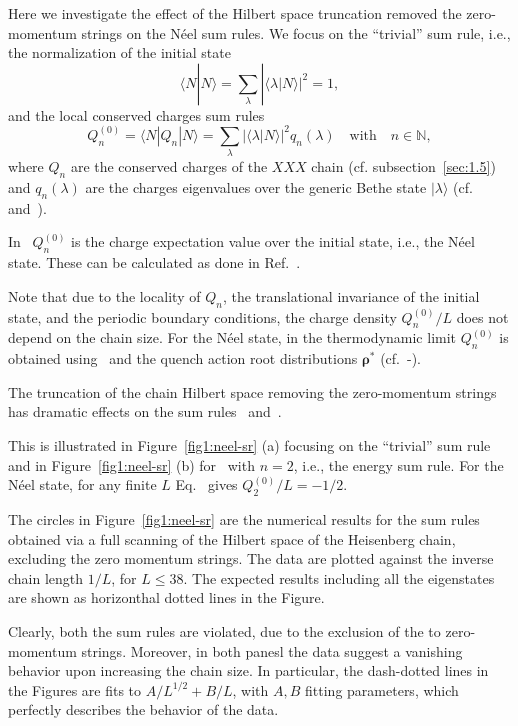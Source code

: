 \documentclass[11pt]{iopart}
\begin{document}
Here we investigate the effect of the Hilbert space truncation removed the 
zero-momentum strings on the N\'eel sum rules. 
We focus on the ``trivial'' sum rule, i.e., the normalization of the initial 
state 
%
\begin{equation}
\label{sr-trivial}
\langle N|N\rangle=\sum\limits_{\lambda}|\langle\lambda|N\rangle|^2=1, 
\end{equation}
%
and the local conserved charges sum rules 
%
\begin{equation}
\label{sr-charge}
Q_n^{(0)}=\langle N|Q_n|N\rangle=\sum\limits_{\lambda}|\langle\lambda|N\rangle|^2
q_{n}(\lambda)\quad\textrm{with}\quad n\in\mathbb{N}, 
\end{equation}
%
where $Q_n$ are the conserved charges of the $XXX$ chain (cf. 
subsection~\ref{sec:1.5}) and $q_n(\lambda)$ are the charges eigenvalues over 
the generic Bethe state $|\lambda\rangle$ (cf.~ and~). 

In~ $Q_n^{(0)}$ is the charge expectation value over the initial 
state, i.e., the N\'eel state. These can be calculated as done in 
Ref.~\cite{fagotti-2013}. 

Note that due to the locality of $Q_n$, the translational invariance of the initial 
state, and the periodic boundary conditions, the charge density $Q_n^{(0)}/L$ does 
not depend on the chain size. For the N\'eel state, in the thermodynamic limit 
$Q_n^{(0)}$ is obtained using~ and the quench action root distributions 
$\pmb{\rho}^*$ (cf.~-). 

The truncation of the chain Hilbert space removing the zero-momentum strings has 
dramatic effects on the sum rules~ and~. 

This is illustrated in Figure~\ref{fig1:neel-sr} (a) focusing on the ``trivial'' 
sum rule~ and in Figure~\ref{fig1:neel-sr} (b) for~ 
with $n=2$, i.e., the energy sum rule. 
For the N\'eel state, for any finite $L$ Eq.~ gives $Q^{(0)}_2/L=-1/2$. 

The circles in Figure~\ref{fig1:neel-sr} are the numerical results for the sum rules 
obtained via a full scanning of the Hilbert space of the Heisenberg chain, excluding 
the zero momentum strings. The data are plotted against the inverse chain length $1/L$, 
for $L\le 38$. The expected results including all the eigenstates are shown as 
horizonthal dotted lines in the Figure. 

Clearly, both the sum rules are violated, due to the exclusion of the to zero-momentum 
strings. Moreover, in both panesl the data suggest a vanishing behavior upon increasing 
the chain size. In particular, the dash-dotted lines in the Figures are fits to  
$A/L^{1/2}+B/L$, with $A,B$ fitting parameters, which perfectly describes the behavior 
of the data. 
\end{document}
